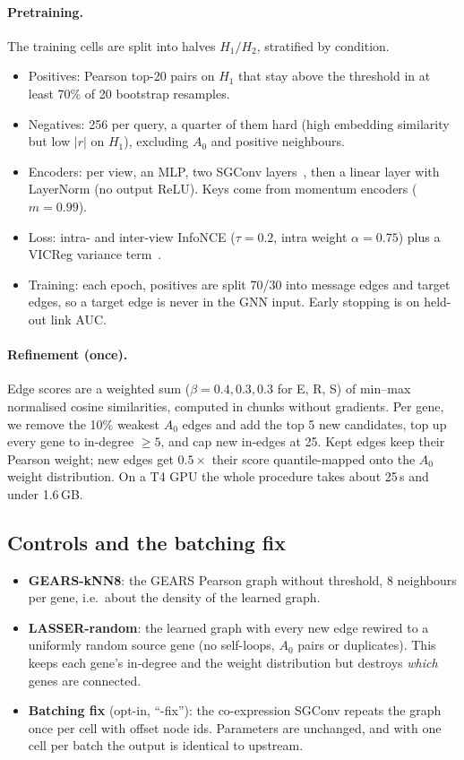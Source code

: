 \documentclass[11pt]{article}
\newcommand{\GEARS}{\textsc{GEARS}}
\begin{document}
\paragraph{Pretraining.} The training cells are split into halves $H_1/H_2$, stratified by condition.
\begin{itemize}
  \item Positives: Pearson top-20 pairs on $H_1$ that stay above the threshold in at least 70\% of 20 bootstrap
        resamples.
  \item Negatives: 256 per query, a quarter of them hard (high embedding similarity but low $|r|$ on $H_1$),
        excluding $A_0$ and positive neighbours.
  \item Encoders: per view, an MLP, two SGConv layers~\cite{wu2019sgc}, then a linear layer with LayerNorm (no
        output ReLU). Keys come from momentum encoders ($m{=}0.99$).
  \item Loss: intra- and inter-view InfoNCE ($\tau{=}0.2$, intra weight $\alpha{=}0.75$) plus a VICReg variance
        term~\cite{bardes2022vicreg}.
  \item Training: each epoch, positives are split 70/30 into message edges and target edges, so a target edge is
        never in the GNN input. Early stopping is on held-out link AUC.
\end{itemize}

\paragraph{Refinement (once).} Edge scores are a weighted sum ($\beta = 0.4, 0.3, 0.3$ for E, R, S) of min--max
normalised cosine similarities, computed in chunks without gradients. Per gene, we remove the 10\% weakest $A_0$
edges and add the top 5 new candidates, top up every gene to in-degree $\ge 5$, and cap new in-edges at 25. Kept
edges keep their Pearson weight; new edges get $0.5\times$ their score quantile-mapped onto the $A_0$ weight
distribution. On a T4 GPU the whole procedure takes about 25\,s and under 1.6\,GB.

\subsection{Controls and the batching fix}
\begin{itemize}
  \item \textbf{GEARS-kNN8}: the \GEARS{} Pearson graph without threshold, 8 neighbours per gene, i.e.\ about the
        density of the learned graph.
  \item \textbf{LASSER-random}: the learned graph with every new edge rewired to a uniformly random source gene
        (no self-loops, $A_0$ pairs or duplicates). This keeps each gene's in-degree and the weight distribution but
        destroys \emph{which} genes are connected.
  \item \textbf{Batching fix} (opt-in, ``-fix''): the co-expression SGConv repeats the graph once per cell with
        offset node ids. Parameters are unchanged, and with one cell per batch the output is identical to upstream.
\end{itemize}
\end{document}
